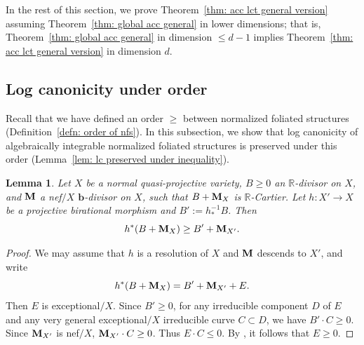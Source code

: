 \documentclass[11pt,reqno]{amsart}
\numberwithin{equation}{section}
\newcommand{\bb}{\bm{b}}
\newcommand{\Mm}{{\bf{M}}}
\newtheorem{lem}[thm]{Lemma}
\theoremstyle{definition}
\begin{document}
In the rest of this section, we prove Theorem~\ref{thm: acc lct general version} assuming Theorem~\ref{thm: global acc general} in lower dimensions; that is, Theorem~\ref{thm: global acc general} in dimension $\leq d-1$ implies Theorem~\ref{thm: acc lct general version} in dimension $d$.

\subsection{Log canonicity under order}\label{subsec: log canonicity under order} Recall that we have defined an order $\geq$ between normalized foliated structures (Definition~\ref{defn: order of nfs}). In this subsection, we show that log canonicity of algebraically integrable normalized foliated structures is preserved under this order (Lemma~\ref{lem: lc preserved under inequality}).

\begin{lem}\label{lem: neg lem for generalized boundary}
    Let $X$ be a normal quasi-projective variety, $B\geq 0$ an $\mathbb R$-divisor on $X$, and $\Mm$ a nef$/X$ $\bb$-divisor on $X$, such that $B+\Mm_X$ is $\mathbb R$-Cartier. Let $h\colon X'\rightarrow X$ be a projective birational morphism and $B':=h^{-1}_*B$. Then
    $$h^*(B+\Mm_X)\geq B'+\Mm_{X'}.$$
\end{lem}
\begin{proof}
We may assume that $h$ is a resolution of $X$ and $\Mm$ descends to $X'$, and write
$$h^*(B+\Mm_X)=B'+\Mm_{X'}+E.$$
Then $E$ is exceptional$/X$. Since $B'\geq 0$, for any irreducible component $D$ of $E$ and any very general exceptional$/X$ irreducible curve $C\subset D$, we have $B'\cdot C\geq 0$. Since $\Mm_{X'}$ is nef$/X$, $\Mm_{X'}\cdot C\geq 0$. Thus $E\cdot C\leq 0$. By \cite[Lemma~3.3]{Bir12}, it follows that $E\geq 0$.
\end{proof}
\end{document}
